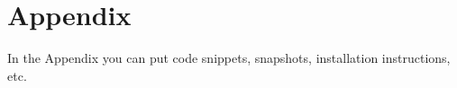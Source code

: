 \chapter{Appendix}\label{ch:appendix}

In the Appendix you can put code snippets, snapshots, installation instructions, etc.
